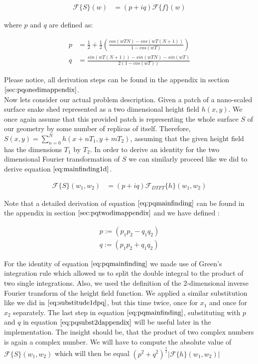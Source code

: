 \begin{align}
\mathcal{F}\{S\}(w)
& = (p+iq) \mathcal{F}\{f\}(w)  
\label{eq:mainfinding1d}
\end{align}

where $p$ and $q$ are defined as:

\begin{align}
p& =\frac{1}{2}+\frac{1}{2}\left(\frac{cos(wTN)-cos(wT(N+1))}{1-cos(wT)}\right) \nonumber \\
q& =\frac{sin(wT(N+1))-sin(wTN)-sin(wT)}{2(1-cos(wT))}
\end{align}

Please notice, all derivation steps can be found in the appendix in section $\ref{sec:pqonedimappendix}$. \\

Now lets consider our actual problem description. Given a patch of a nano-scaled surface snake shed represented as a two dimensional height field $h(x,y)$. We once again assume that this provided patch is representing the whole surface $S$ of our geometry by some number of replicas of itself. Therefore, $S(x,y) = \sum_{n=0}^{N} h(x+nT_1, y+mT_2)$, assuming that the given height field has the dimensions $T_1$ by $T_2$. In order to derive an identity for the two dimensional Fourier transformation of $S$ we can similarly proceed like we did to derive equation $\ref{eq:mainfinding1d}$.

\begin{align}
\mathcal{F}\{S\}(w_1, w_2)
& =(p + iq) \mathcal{F}_{DTFT}\{h\}(w_1,w_2)
\label{eq:pqmainfinding}
\end{align}

Note that a detailed derivation of equation $\ref{eq:pqmainfinding}$ can be found in the appendix in section $\ref{sec:pqtwodimappendix}$ and we have defined :

\begin{align}
p := (p_1 p_2 - q_1 q_2) \nonumber \\ 
q := (p_1 p_2 + q_1 q_2)
\label{eq:pqsubst2}
\end{align}

For the identity of equation $\ref{eq:pqmainfinding}$ we made use of Green's integration rule which allowed us to split the double integral to the product of two single integrations. Also, we used the definition of the 2-dimensional inverse Fourier transform of the height field function. We applied a similar substitution like we did in $\ref{eq:substitude1dpq}$, but this time twice, once for $x_1$ and once for $x_2$ separately. The last step in equation $\ref{eq:pqmainfinding}$, substituting with $p$ and $q$ in equation $\ref{eq:pqsubst2dappendix}$ will be useful later in the implementation. The insight should be, that the product of two complex numbers is again a complex number. We will have to compute the absolute value of $\mathcal{F}\{S\}(w_1,w_2)$ which will then be equal $(p^2 + q^2)^{\frac{1}{2}}\left|\mathcal{F}\{h\}(w_1,w_2)\right|$

